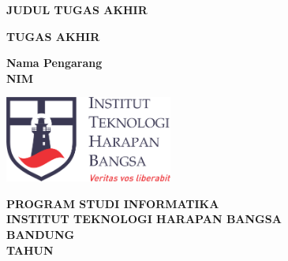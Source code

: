 \begin{titlepage}
	\begin{center}
		\vspace*{0cm}
		
		{\large \bfseries JUDUL TUGAS AKHIR\\}
			
		\vspace{3cm}
		
	 	{\large \bfseries TUGAS AKHIR}

		\vspace{2.5cm}
		
		{ \bfseries Nama Pengarang \\ NIM }
		
	
		\vspace*{\fill} 
		
		\includegraphics[width=5.5cm]{img/ithb.png}
	
		\vspace{2.5cm}

		{\large \bfseries PROGRAM STUDI INFORMATIKA \\
		INSTITUT TEKNOLOGI HARAPAN BANGSA \\
		BANDUNG\\
		TAHUN}
		
		\vspace{1cm}
	\end{center}
\end{titlepage}